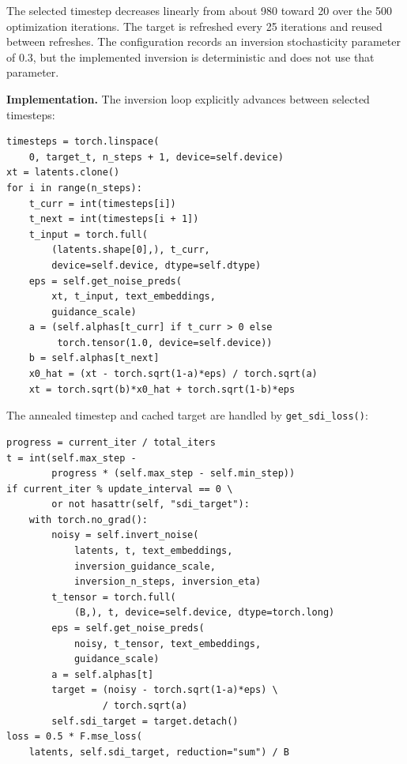 The selected timestep decreases linearly from about 980 toward 20 over the 500 optimization iterations. The target is refreshed every 25 iterations and reused between refreshes. The configuration records an inversion stochasticity parameter of 0.3, but the implemented inversion is deterministic and does not use that parameter.

\noindent\textbf{Implementation.} The inversion loop explicitly advances between selected timesteps:
\begin{lstlisting}
timesteps = torch.linspace(
    0, target_t, n_steps + 1, device=self.device)
xt = latents.clone()
for i in range(n_steps):
    t_curr = int(timesteps[i])
    t_next = int(timesteps[i + 1])
    t_input = torch.full(
        (latents.shape[0],), t_curr,
        device=self.device, dtype=self.dtype)
    eps = self.get_noise_preds(
        xt, t_input, text_embeddings,
        guidance_scale)
    a = (self.alphas[t_curr] if t_curr > 0 else
         torch.tensor(1.0, device=self.device))
    b = self.alphas[t_next]
    x0_hat = (xt - torch.sqrt(1-a)*eps) / torch.sqrt(a)
    xt = torch.sqrt(b)*x0_hat + torch.sqrt(1-b)*eps
\end{lstlisting}

The annealed timestep and cached target are handled by \texttt{get\_sdi\_loss()}:
\begin{lstlisting}
progress = current_iter / total_iters
t = int(self.max_step -
        progress * (self.max_step - self.min_step))
if current_iter % update_interval == 0 \
        or not hasattr(self, "sdi_target"):
    with torch.no_grad():
        noisy = self.invert_noise(
            latents, t, text_embeddings,
            inversion_guidance_scale,
            inversion_n_steps, inversion_eta)
        t_tensor = torch.full(
            (B,), t, device=self.device, dtype=torch.long)
        eps = self.get_noise_preds(
            noisy, t_tensor, text_embeddings,
            guidance_scale)
        a = self.alphas[t]
        target = (noisy - torch.sqrt(1-a)*eps) \
                 / torch.sqrt(a)
        self.sdi_target = target.detach()
loss = 0.5 * F.mse_loss(
    latents, self.sdi_target, reduction="sum") / B
\end{lstlisting}
